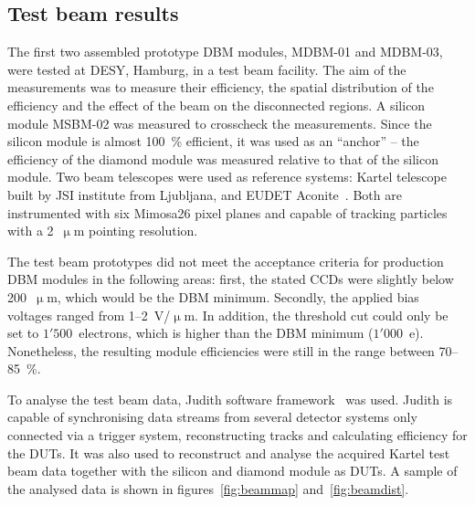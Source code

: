 \subsection{Test beam results}
The first two assembled prototype DBM modules, MDBM-01 and MDBM-03, were tested at DESY, Hamburg, in a test beam facility. The aim of the measurements was to measure their efficiency, the spatial distribution of the efficiency and the effect of the beam on the disconnected regions. A silicon module MSBM-02 was measured to crosscheck the measurements. Since the silicon module is almost 100~\% efficient, it was used as an ``anchor'' -- the efficiency of the diamond module was measured relative to that of the silicon module. Two beam telescopes were used as reference systems: Kartel telescope~\cite{McGoldrick:1982209} built by JSI institute from Ljubljana, and EUDET Aconite~\cite{ACONI:00000}. Both are instrumented with six Mimosa26 pixel planes and capable of tracking particles with a 2~$\upmu$m pointing resolution.

The test beam prototypes did not meet the acceptance criteria for production DBM modules in the following areas: first, the stated CCDs were slightly below 200~$\upmu$m, which would be the DBM minimum. Secondly, the applied bias voltages ranged from 1--2~V/$\upmu$m. In addition, the threshold cut could only be set to $1'500$~electrons, which is higher than the DBM minimum ($1'000$~e). Nonetheless, the resulting module efficiencies were still in the range between 70--85~\%.

To analyse the test beam data, Judith software framework~\cite{McGoldrick:1982209} was used. Judith is capable of synchronising data streams from several detector systems only connected via a trigger system, reconstructing tracks and calculating efficiency for the DUTs. It was also used to reconstruct and analyse the acquired Kartel test beam data together with the silicon and diamond module as DUTs. A sample of the analysed data is shown in figures~\ref{fig:beammap} and~\ref{fig:beamdist}. 


